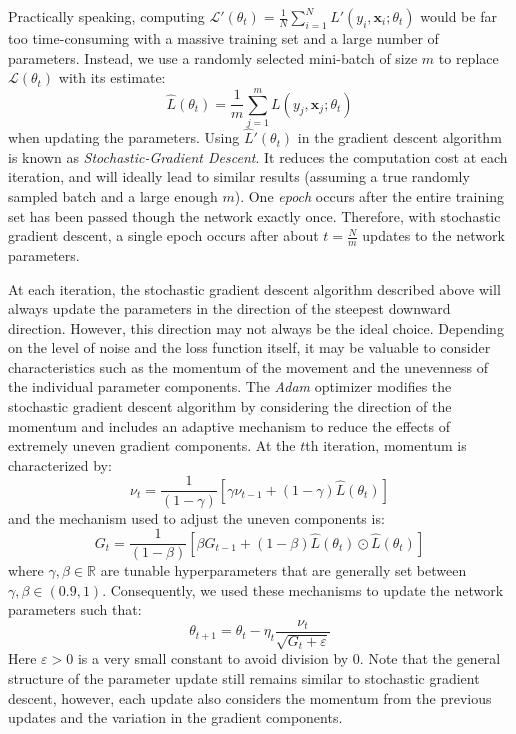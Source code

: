 \documentclass [MAS] {uclathes}
\begin{document}
Practically speaking, computing $\mathcal{L}'(\theta_t) = \frac{1}{N} \sum_{i=1}^{N} L'(y_i, \mathbf{x}_i; \theta_t)$ would be far too time-consuming with a massive training set and a large number of parameters. Instead, we use a randomly selected mini-batch of size $m$ to replace $\mathcal{L}(\theta_t)$ with its estimate: $$\hat{L}(\theta_t) = \frac{1}{m} \sum_{j=1}^{m} L(y_j, \mathbf{x}_j; \theta_t)$$ when updating the parameters. Using $\hat{L}'(\theta_t)$ in the gradient descent algorithm is known as \textit{Stochastic-Gradient Descent}. It reduces the computation cost at each iteration, and will ideally lead to similar results (assuming a true randomly sampled batch and a large enough $m$). One \textit{epoch} occurs after the entire training set has been passed though the network exactly once. Therefore, with stochastic gradient descent, a single epoch occurs after about $t=\frac{N}{m}$ updates to the network parameters.

At each iteration, the stochastic gradient descent algorithm described above will always update the parameters in the direction of the steepest downward direction. However, this direction may not always be the ideal choice. Depending on the level of noise and the loss function itself, it may be valuable to consider characteristics such as the momentum of the movement and the unevenness of the individual parameter components. The \textit{Adam} optimizer modifies the stochastic gradient descent algorithm by considering the direction of the momentum and includes an adaptive mechanism to reduce the effects of extremely uneven gradient components. At the $t$th iteration, momentum is characterized by: $$\nu_t = \frac{1}{(1-\gamma)} \left[ \gamma \nu_{t-1} + (1-\gamma)\hat{L}(\theta_t) \right]$$ and the mechanism used to adjust the uneven components is: $$G_t = \frac{1}{(1-\beta)} \left[ \beta G_{t-1} + (1-\beta)\hat{L}(\theta_t) \odot \hat{L}(\theta_t)\right]$$ where $\gamma, \beta \in \mathbb{R}$ are tunable hyperparameters that are generally set between $\gamma, \beta \in (0.9, 1)$. Consequently, we used these mechanisms to update the network parameters such that: $$\theta_{t+1} = \theta_{t} - \eta_t \frac{\nu_t}{\sqrt{G_t + \varepsilon}}$$ Here $\varepsilon>0$ is a very small constant to avoid division by 0. Note that the general structure of the parameter update still remains similar to stochastic gradient descent, however, each update also considers the momentum from the previous updates and the variation in the gradient components.
\end{document}
